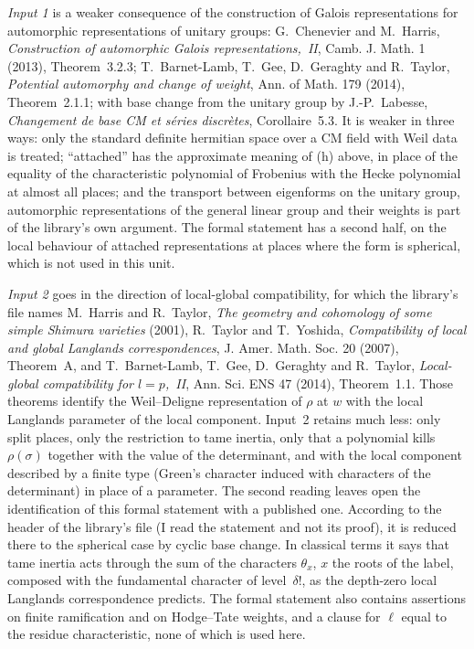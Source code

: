 \documentclass[11pt,a4paper]{article}
\theoremstyle{plainx}
\theoremstyle{uprightx}
\begin{document}
\emph{Input 1} is a weaker consequence of the construction of Galois representations for automorphic
representations of unitary groups: G.~Chenevier and M.~Harris, \emph{Construction of automorphic Galois
representations,~II}, Camb. J. Math. 1 (2013), Theorem~3.2.3; T.~Barnet-Lamb, T.~Gee, D.~Geraghty and R.~Taylor,
\emph{Potential automorphy and change of weight}, Ann. of Math. 179 (2014), Theorem~2.1.1; with base change from
the unitary group by J.-P.~Labesse, \emph{Changement de base CM et séries discrètes}, Corollaire~5.3. It is weaker
in three ways: only the standard definite hermitian space over a CM field with Weil data is treated; ``attached''
has the approximate meaning of (h) above, in place of the equality of the characteristic polynomial of Frobenius
with the Hecke polynomial at almost all places; and the transport between eigenforms on the unitary group,
automorphic representations of the general linear group and their weights is part of the library's own argument.
The formal statement has a second half, on the local behaviour of attached representations at places where the
form is spherical, which is not used in this unit.

\emph{Input 2} goes in the direction of local-global compatibility, for which the library's file names
M.~Harris and R.~Taylor, \emph{The geometry and cohomology of some simple Shimura varieties} (2001), R.~Taylor and
T.~Yoshida, \emph{Compatibility of local and global Langlands correspondences}, J. Amer. Math. Soc. 20 (2007),
Theorem~A, and T.~Barnet-Lamb, T.~Gee, D.~Geraghty and R.~Taylor, \emph{Local-global compatibility for $l=p$,~II},
Ann. Sci. ENS 47 (2014), Theorem~1.1. Those theorems identify the Weil--Deligne representation of
$\rho$ at $w$ with the local Langlands parameter of the local component. Input~2 retains much less: only split
places, only the restriction to tame inertia, only that a polynomial kills $\rho(\sigma)$ together with the value
of the determinant, and with the local component described by a finite type (Green's character induced with
characters of the determinant) in place of a parameter. The second reading leaves open the identification of
this formal statement with a published one. According to the header of the library's file (I read the statement
and not its proof), it is reduced there to the spherical case by cyclic base change. In classical terms it says that tame inertia acts through the sum of the characters $\theta_x$, $x$ the
roots of the label, composed with the fundamental character of level~$\delta!$, as the depth-zero local Langlands
correspondence predicts. The formal statement also contains assertions on finite ramification and on
Hodge--Tate weights, and a clause for $\ell$ equal to the residue characteristic, none of which is used here.
\end{document}
